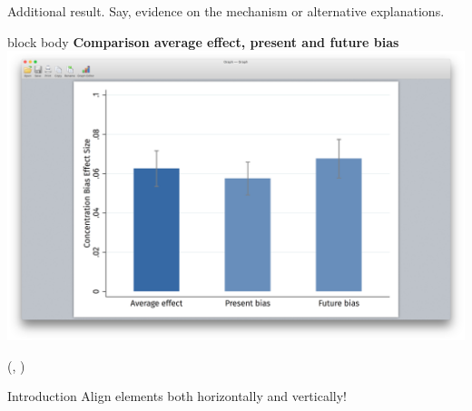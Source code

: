 \documentclass{beamer}
\newlength{\blockThree}
\begin{document}
\begin{frame}[t]
\begin{textblock*}{\colwidth}
\begin{alertblock}{%
	\begin{minipage}[b]{60pt}
		\RaggedRight
		\noindent\hspace{-10pt}
	\end{minipage}%
	\begin{minipage}[b]{\colwidth-125pt}\strut%
		Additional result.\;
		{\mdseries Say, evidence on the mechanism or alternative explanations.}
	\end{minipage}%
}
	\begin{beamercolorbox}[ht = 19.75cm, wd = 0.975\linewidth, center]{block body}
		\textcolor{SpotColor}{\textbf{Comparison average effect, present and future bias}}\\[46pt]
		\includegraphics[width = 0.975\linewidth, trim = {9.5cm 4.5cm 9.5cm 5cm}, clip]
			{1_Example_Content/Images/average_pb_fb.png}\hspace{0.5cm}\null\\[25pt]
	\end{beamercolorbox}
\end{alertblock}

\end{textblock*}







\TPshowboxesfalse

\begin{textblock*}{\colwidth}(\leftmargin, \blockThree)

\begin{parblock}{Introduction}
	\alert{Align elements both horizontally and vertically!}


\end{parblock}
\end{textblock*}
\end{frame}
\end{document}
